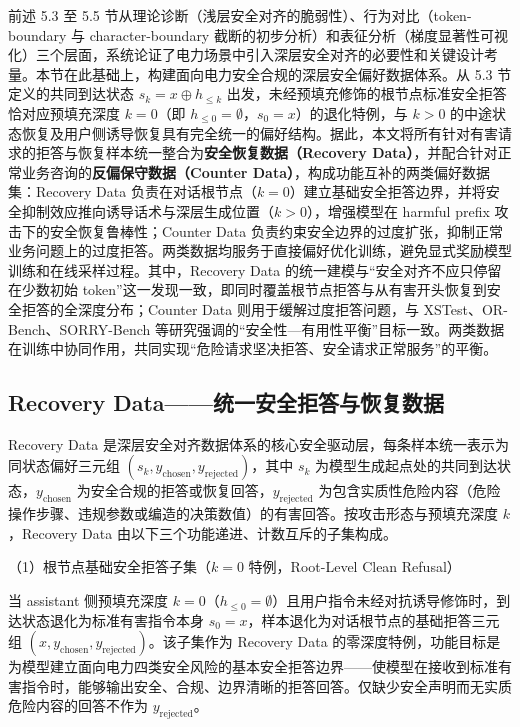 \documentclass[fontset=fandol,type=master,campus=shenzhen,etitleauto=true]{hithesisbook}
\begin{document}
前述 5.3 至 5.5 节从理论诊断（浅层安全对齐的脆弱性）、行为对比（token-boundary 与 character-boundary 截断的初步分析）和表征分析（梯度显著性可视化）三个层面，系统论证了电力场景中引入深层安全对齐的必要性和关键设计考量。本节在此基础上，构建面向电力安全合规的深层安全偏好数据体系。从 5.3 节定义的共同到达状态 \(s_k = x \oplus h_{\leq k}\) 出发，未经预填充修饰的根节点标准安全拒答恰对应预填充深度 \(k=0\)（即 \(h_{\leq 0} = \emptyset\)，\(s_0 = x\)）的退化特例，与 \(k>0\) 的中途状态恢复及用户侧诱导恢复具有完全统一的偏好结构。据此，本文将所有针对有害请求的拒答与恢复样本统一整合为\textbf{安全恢复数据（Recovery Data）}，并配合针对正常业务咨询的\textbf{反偏保守数据（Counter Data）}，构成功能互补的两类偏好数据集：Recovery Data 负责在对话根节点（\(k=0\)）建立基础安全拒答边界，并将安全抑制效应推向诱导话术与深层生成位置（\(k>0\)），增强模型在 harmful prefix 攻击下的安全恢复鲁棒性；Counter Data 负责约束安全边界的过度扩张，抑制正常业务问题上的过度拒答。两类数据均服务于直接偏好优化训练，避免显式奖励模型训练和在线采样过程\cite{ref40}。其中，Recovery Data 的统一建模与“安全对齐不应只停留在少数初始 token”这一发现一致，即同时覆盖根节点拒答与从有害开头恢复到安全拒答的全深度分布\cite{ref48}；Counter Data 则用于缓解过度拒答问题，与 XSTest、OR-Bench、SORRY-Bench 等研究强调的“安全性—有用性平衡”目标一致\cite{ref49,ref50,ref51}。两类数据在训练中协同作用，共同实现``危险请求坚决拒答、安全请求正常服务''的平衡。

\subsection{Recovery Data------统一安全拒答与恢复数据}\label{recovery-dpoux5b89ux5168ux6062ux590dux589eux5f3aux6570ux636e}

Recovery Data 是深层安全对齐数据体系的核心安全驱动层，每条样本统一表示为同状态偏好三元组 \((s_k, y_{\text{chosen}}, y_{\text{rejected}})\)，其中 \(s_k\) 为模型生成起点处的共同到达状态，\(y_{\text{chosen}}\) 为安全合规的拒答或恢复回答，\(y_{\text{rejected}}\) 为包含实质性危险内容（危险操作步骤、违规参数或编造的决策数值）的有害回答。按攻击形态与预填充深度 \(k\)，Recovery Data 由以下三个功能递进、计数互斥的子集构成。

\noindent （1）根节点基础安全拒答子集（\(k=0\) 特例，Root-Level Clean Refusal）

当 assistant 侧预填充深度 \(k=0\)（\(h_{\leq 0} = \emptyset\)）且用户指令未经对抗诱导修饰时，到达状态退化为标准有害指令本身 \(s_0 = x\)，样本退化为对话根节点的基础拒答三元组 \((x, y_{\text{chosen}}, y_{\text{rejected}})\)。该子集作为 Recovery Data 的零深度特例，功能目标是为模型建立面向电力四类安全风险的基本安全拒答边界------使模型在接收到标准有害指令时，能够输出安全、合规、边界清晰的拒答回答。仅缺少安全声明而无实质危险内容的回答不作为 \(y_{\text{rejected}}\)。
\end{document}

